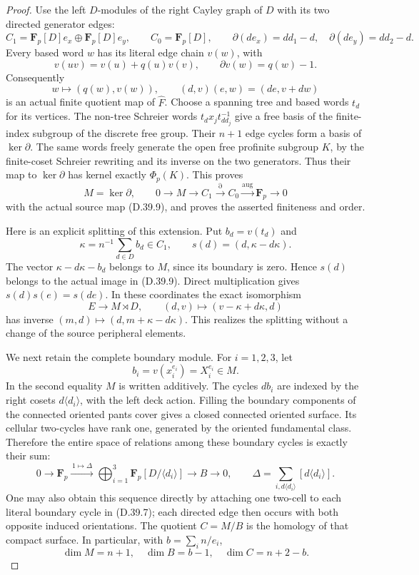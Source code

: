 \begin{proof}
Use the left \(D\)-modules of the right Cayley graph of
\(D\) with its two directed generator edges:
\[
 C_1=\mathbf F_p[D]e_x\oplus\mathbf F_p[D]e_y,\qquad
 C_0=\mathbf F_p[D],\qquad
 \partial(de_x)=d d_1-d,\quad
 \partial(de_y)=d d_2-d.
 \tag{D.39.7}
\]
Every based word \(w\) has its literal edge chain
\(v(w)\), with
\[
 v(uv)=v(u)+q(u)v(v),\qquad
 \partial v(w)=q(w)-1.
 \tag{D.39.8}
\]
Consequently
\[
 w\longmapsto(q(w),v(w)),\qquad
 (d,v)(e,w)=(de,v+dw)
 \tag{D.39.9}
\]
is an actual finite quotient map of \(\widehat F\).
Choose a spanning tree and based words \(t_d\) for its
vertices.  The non-tree Schreier words
\(t_d x_jt_{d d_j}^{-1}\) give a free basis of the
finite-index subgroup of the discrete free group.
Their \(n+1\) edge cycles form a basis of \(\ker\partial\).
The same words freely generate the open free profinite
subgroup \(K\), by the finite-coset Schreier rewriting
and its inverse on the two generators.
Thus their map to \(\ker\partial\) has kernel exactly
\(\Phi_p(K)\).  This proves
\[
 M=\ker\partial,\qquad
 0\longrightarrow M\longrightarrow C_1
   \xrightarrow{\partial} C_0
   \xrightarrow{\mathrm{aug}}\mathbf F_p\longrightarrow0
 \tag{D.39.10}
\]
with the actual source map \textup{(D.39.9)}, and proves
the asserted finiteness and order.

Here is an explicit splitting of this extension.
Put \(b_d=v(t_d)\) and
\[
 \kappa=n^{-1}\sum_{d\in D}b_d\in C_1,\qquad
 s(d)=(d,\kappa-d\kappa).
 \tag{D.39.11}
\]
The vector \(\kappa-d\kappa-b_d\) belongs to
\(M\), since its boundary is zero.  Hence \(s(d)\)
belongs to the actual image in \textup{(D.39.9)}.
Direct multiplication gives \(s(d)s(e)=s(de)\).
In these coordinates the exact isomorphism
\[
 E\longrightarrow M\rtimes D,\qquad
 (d,v)\longmapsto(v-\kappa+d\kappa,d)
 \tag{D.39.12}
\]
has inverse \((m,d)\mapsto(d,m+\kappa-d\kappa)\).
This realizes the splitting without a change of the
source peripheral elements.

We next retain the complete boundary module.
For \(i=1,2,3\), let
\[
 b_i=v(x_i^{e_i})=X_i^{e_i}\in M.
 \tag{D.39.13}
\]
In the second equality \(M\) is written additively.
The cycles \(d b_i\) are indexed by the right cosets
\(d\langle d_i\rangle\), with the left deck action.
Filling the boundary components of the connected
oriented pants cover gives a closed connected
oriented surface.  Its cellular two-cycles have
rank one, generated by the oriented fundamental
class.  Therefore the entire space of relations
among these boundary cycles is exactly their sum:
\[
 0\longrightarrow\mathbf F_p
 \xrightarrow{\,1\mapsto\Delta\,}
 \bigoplus_{i=1}^3
       \mathbf F_p[D/\langle d_i\rangle]
 \longrightarrow B\longrightarrow0,\qquad
 \Delta=\sum_{i,d\langle d_i\rangle}
                    [d\langle d_i\rangle].
 \tag{D.39.14}
\]
One may also obtain this sequence directly by attaching
one two-cell to each literal boundary cycle in
\textup{(D.39.7)}; each directed edge then occurs with
both opposite induced orientations.
The quotient \(C=M/B\) is the homology of that
compact surface.  In particular, with
\(b=\sum_i n/e_i\),
\[
 \dim M=n+1,\quad \dim B=b-1,\quad
 \dim C=n+2-b.
 \tag{D.39.15}
\]


\end{proof}
